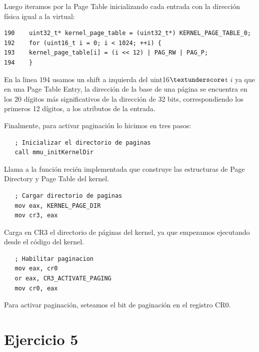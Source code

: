 \documentclass[a4paper]{article}
\newenvironment{codesnippet}{%
	\begin{Sbox}\begin{minipage}{\textwidth}\sffamily\small}%
	{\end{minipage}\end{Sbox}%
		\begin{center}%
		\vspace{-0.4cm}\colorbox{litegrey}{\TheSbox}\end{center}\vspace{0.3cm}}
\begin{document}
Luego iteramos por la Page Table inicializando cada entrada con la dirección física igual a la virtual:
	\begin{codesnippet}
  \begin{verbatim}
190    uint32_t* kernel_page_table = (uint32_t*) KERNEL_PAGE_TABLE_0;
192    for (uint16_t i = 0; i < 1024; ++i) {
193	   kernel_page_table[i] = (i << 12) | PAG_RW | PAG_P;
194    }
	  \end{verbatim}
\end{codesnippet}

En la linea 194 usamos un shift a izquierda del uint16$\textunderscore$t $i$ ya que en una Page Table Entry, la
dirección de la base de una página se encuentra en los 20 dígitos más significativos de la dirección de 32 bits,
correspondiendo los primeros 12 dígitos, a los atributos de la entrada.

Finalmente, para activar paginación lo hicimos en tres pasos:

	\begin{codesnippet}
  \begin{verbatim}
   ; Inicializar el directorio de paginas
   call mmu_initKernelDir
	  \end{verbatim}
\end{codesnippet}

Llama a la función recién implementada que construye las estructuras de Page Directory y Page Table del kernel.	
	
	\begin{codesnippet}
  \begin{verbatim}
   ; Cargar directorio de paginas
   mov eax, KERNEL_PAGE_DIR
   mov cr3, eax
	  \end{verbatim}
\end{codesnippet}
	
Carga en CR3 el directorio de páginas del kernel, ya que empezamos ejecutando desde el código del kernel.
	
	\begin{codesnippet}
  \begin{verbatim}
   ; Habilitar paginacion
   mov eax, cr0
   or eax, CR3_ACTIVATE_PAGING
   mov cr0, eax
      \end{verbatim}
\end{codesnippet}
    
Para activar paginación, seteamos el bit de paginación en el registro CR0.

\section{Ejercicio 5}
\end{document}
